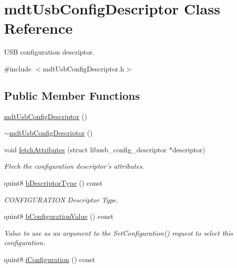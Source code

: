 \hypertarget{classmdt_usb_config_descriptor}{\section{mdt\-Usb\-Config\-Descriptor Class Reference}
\label{classmdt_usb_config_descriptor}
}


U\-S\-B configuration descriptor.  




{\ttfamily \#include $<$mdt\-Usb\-Config\-Descriptor.\-h$>$}

\subsection*{Public Member Functions}
\begin{DoxyCompactItemize}
\item 
\hyperlink{classmdt_usb_config_descriptor_a27d865718f38302de291d85d1ed667c1}{mdt\-Usb\-Config\-Descriptor} ()
\item 
\hyperlink{classmdt_usb_config_descriptor_a181462448ef201e92fedc5873c79d899}{$\sim$mdt\-Usb\-Config\-Descriptor} ()
\item 
void \hyperlink{classmdt_usb_config_descriptor_acece47193e1ab7184894082a40233f45}{fetch\-Attributes} (struct libusb\-\_\-config\-\_\-descriptor $\ast$descriptor)
\begin{DoxyCompactList}\small\item\em Ftech the configuration descriptor's attributes. \end{DoxyCompactList}\item 
quint8 \hyperlink{classmdt_usb_config_descriptor_a7bac684b7862455bad66189a2ce9603b}{b\-Descriptor\-Type} () const 
\begin{DoxyCompactList}\small\item\em C\-O\-N\-F\-I\-G\-U\-R\-A\-T\-I\-O\-N Descriptor Type. \end{DoxyCompactList}\item 
quint8 \hyperlink{classmdt_usb_config_descriptor_ab61472d4050abb29a4815e194869ea88}{b\-Configuration\-Value} () const 
\begin{DoxyCompactList}\small\item\em Value to use as an argument to the Set\-Configuration() request to select this configuration. \end{DoxyCompactList}\item 
quint8 \hyperlink{classmdt_usb_config_descriptor_a37b48b43509d4575d2dd714e745db57b}{i\-Configuration} () const 

\end{DoxyCompactItemize}
